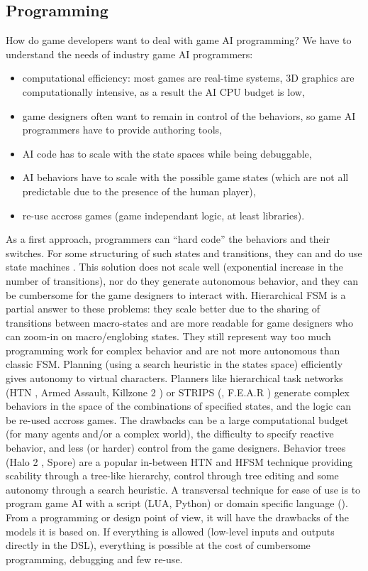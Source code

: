 \subsection{Programming}
How do game developers want to deal with game AI programming? We have to understand the needs of industry game AI programmers: 
\begin{itemize}
    \item computational efficiency: most games are real-time systems, 3D graphics are computationally intensive, as a result the AI CPU budget is low,
    \item game designers often want to remain in control of the behaviors, so game AI programmers have to provide authoring tools,
    \item AI code has to scale with the state spaces while being debuggable,
    \item AI behaviors have to scale with the possible game states (which are not all predictable due to the presence of the human player),
    \item re-use accross games (game independant logic, at least libraries).
\end{itemize}
As a first approach, programmers can ``hard code'' the behaviors and their switches. For some structuring of such states and transitions, they can and do use state machines \citep{FSM_AIGameProgWisdom2003}. This solution does not scale well (exponential increase in the number of transitions), nor do they generate autonomous behavior, and they can be cumbersome for the game designers to interact with. Hierarchical FSM is a partial answer to these problems: they scale better due to the sharing of transitions between macro-states and are more readable for game designers who can zoom-in on macro/englobing states. They still represent way too much programming work for complex behavior and are not more autonomous than classic FSM. Planning (using a search heuristic in the states space) efficiently gives autonomy to virtual characters. Planners like hierarchical task networks (HTN \citep{Erol_htnplanning}, Armed Assault, Killzone 2 \citep{ArmA1_HTN,Killzone2_HTN}) or STRIPS (\citep{FikesSTRIPS}, F.E.A.R \citep{orkinGDC_FEAR}) generate complex behaviors in the space of the combinations of specified states, and the logic can be re-used accross games. The drawbacks can be a large computational budget (for many agents and/or a complex world), the difficulty to specify reactive behavior, and less (or harder) control from the game designers. Behavior trees (Halo 2 \citep{Isla}, Spore) are a popular in-between HTN and HFSM technique providing scability through a tree-like hierarchy, control through tree editing and some autonomy through a search heuristic.
A transversal technique for ease of use is to program game AI with a script (LUA, Python) or domain specific language (). From a programming or design point of view, it will have the drawbacks of the models it is based on. If everything is allowed (low-level inputs and outputs directly in the DSL), everything is possible at the cost of cumbersome programming, debugging and few re-use.

